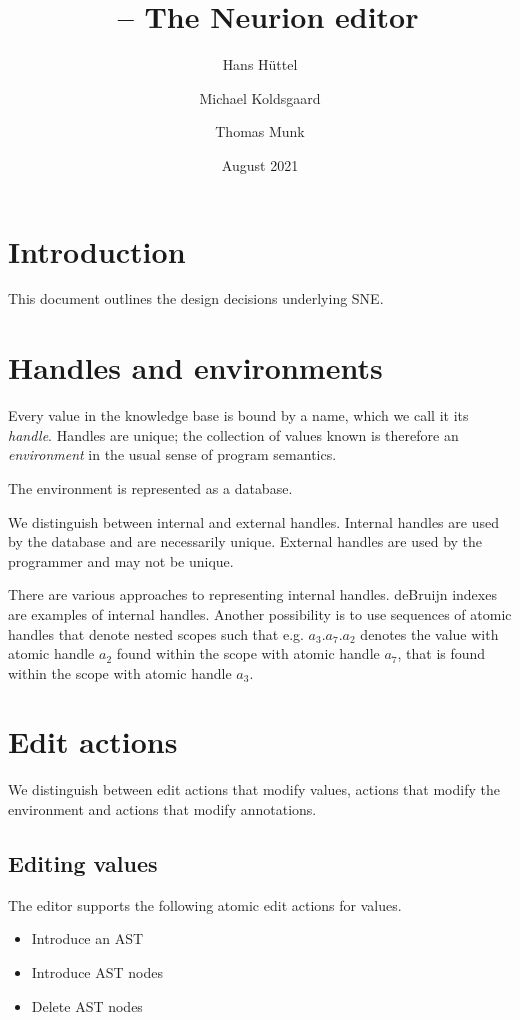 \documentclass{article}
\title{\editor  ~-- The Neurion editor}
\author{Hans Hüttel \and Michael Koldsgaard \and Thomas Munk}
\date{August 2021}
\newcommand{\editor}{\mbox{\textsf{SNE}}}
\begin{document}
\maketitle

\section{Introduction}

This document outlines the design decisions underlying \editor.

\section{Handles and environments}

Every value in the knowledge base is bound by a name, which we call it
its \emph{handle}. Handles are unique; the collection of values known
is therefore an \emph{environment} in the usual sense of program
semantics.

The environment is represented as a database.

We distinguish between internal and external handles. Internal handles
are used by the database and are necessarily unique. External handles
are used by the programmer and may not be unique.

There are various approaches to representing internal
handles. deBruijn indexes are examples of internal handles. Another
possibility is to use sequences of atomic handles that denote nested
scopes such that e.g. $a_3.a_7.a_2$ denotes the value with atomic
handle $a_2$ found within the scope with atomic handle $a_7$, that is
found within the scope with atomic handle $a_3$.

\section{Edit actions}

We distinguish between edit actions that modify values, actions
that modify the environment and actions that modify annotations.

\subsection{Editing values}

The editor supports the following atomic edit actions for values.

\begin{itemize}
\item Introduce an AST
\item Introduce AST nodes
\item Delete AST nodes
\end{itemize}
\end{document}
